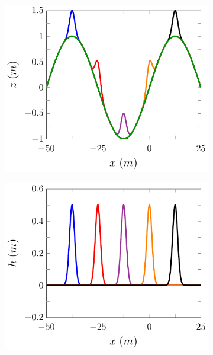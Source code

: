 \begin{figure}
	\centering
	\begin{subfigure}{0.5\textwidth}
		\includegraphics[width=\textwidth]{./chp5/figures/Forced/Dry/P2P/FEVMExw.pdf}
		\vspace{0.5cm}
	\end{subfigure}%
	\begin{subfigure}{0.5\textwidth}
		\includegraphics[width=\textwidth]{./chp5/figures/Forced/Dry/P2P/FEVMExh.pdf}
		\vspace{0.5cm}

\end{subfigure}
\end{figure}
